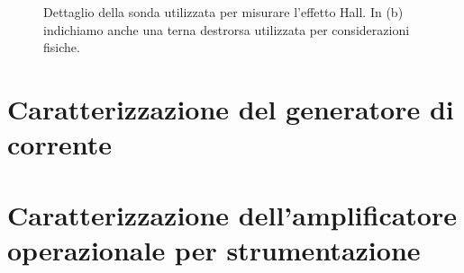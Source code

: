 \documentclass[
    prl,
    reprint, 
    superscriptaddress, 
    altaffilletter, 
    amsmath, 
    amssymb, 
    a4paper,
    varvw]{revtex4-2}
\begin{document}
\begin{figure}
    \hspace{5mm}
    \caption{Dettaglio della sonda utilizzata per misurare l'effetto Hall. In (b) indichiamo anche una terna destrorsa utilizzata per considerazioni fisiche. }\label{fig:misc}
\end{figure}



\appendix
\section{Caratterizzazione del generatore di corrente}\label{sec:appendix_current_gen}

\section{Caratterizzazione dell'amplificatore operazionale per strumentazione}\label{sec:appendix_strum_opamp}


\setcounter{table}{0}
\renewcommand{\thetable}{A-\Roman{table}}

%

\end{document}
